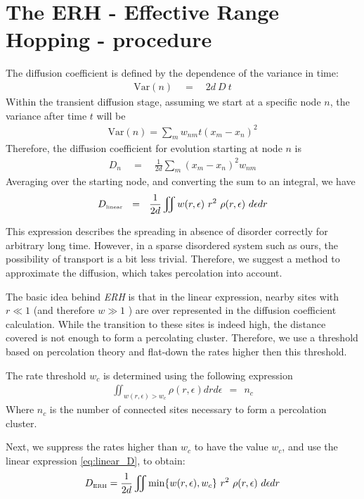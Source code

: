 \section{The ERH - Effective Range Hopping - procedure}

The diffusion coefficient is defined by the dependence
of the variance in time:
%
\begin{align}
\textrm{Var}(n) \quad =\quad 2d\ D\ t
\end{align}
%
Within the transient diffusion stage,
assuming we start at a specific node $n$, the variance after time
$t$ will be
%
\begin{align}
\textrm{Var}(n) = \sum_m w_{nm} t (x_m-x_n)^2
\end{align}
Therefore, the diffusion coefficient for evolution 
starting at node $n$ is
%
\begin{align}
D_n \quad=\quad \frac{1}{2d}\sum_m (x_m-x_n)^2 w_{nm}
\end{align}
%
Averaging over the starting node, and converting the sum to an integral,
we have
%
\begin{align}\label{eq:linear_D}
D_{\tbox{linear}}  \ \ = \ \ \frac{1}{2d}\iint w(r,\epsilon) \ r^2  \ \rho(r,\epsilon) \ d\epsilon dr 
\end{align}
%

This expression describes the spreading in absence of disorder correctly
for arbitrary long time. However, in a sparse disordered system such as ours,
the possibility of transport is a bit less trivial. Therefore, we suggest
a method to approximate the diffusion, which takes percolation into account.


The basic idea behind \emph{ERH} is that in the linear
expression, nearby sites 
with $r\ll 1$ (and therefore $w \gg 1$ ) are over represented in
the diffusion coefficient calculation. While the transition to
these sites is indeed high, the distance covered is not enough
to form a percolating cluster. Therefore, we use a threshold based
on percolation theory and flat-down the rates higher then this threshold.

The rate threshold $w_c$ is determined using the following expression
%
\begin{align}\label{eq:threshold}
\iint_{w(r,\epsilon)>w_c} \rho(r,\epsilon)drd\epsilon \ \ = \ \ n_c
\end{align}
%
Where $n_c$ is the number of connected sites necessary to form a percolation
cluster.


Next, we suppress the rates higher than $w_c$ to have the value $w_c$,
and use the linear expression \ref{eq:linear_D}, to obtain:
%
\begin{align}\label{eq:ERH_D}
D_{\tbox{ERH}} = \frac{1}{2d}\iint \min\{w(r,\epsilon),w_c\} \ r^2  \ \rho(r,\epsilon) \ d\epsilon dr
\end{align}
%


